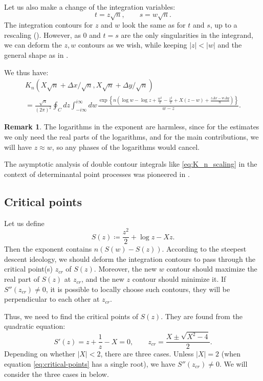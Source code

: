 \documentclass[letterpaper,11pt,oneside,reqno]{article}
\numberwithin{equation}{section}
\newcommand{\ssp}{\hspace{1pt}}
\theoremstyle{definition}
\newtheorem{remark}[proposition]{Remark}
\begin{document}
Let us also make a change of the integration variables:
\begin{equation*}
	t=z\sqrt n,\qquad s=w\sqrt n.
\end{equation*}
The integration contours for $z$ and $w$ look the same as for $t$ and $s$, up to a rescaling
(). However, as $0$
and $t=s$
are the only singularities in the integrand, we can deform the $z,w$
contours as we wish, while keeping $|z|<|w|$
and the general shape as in .

We thus have:
\begin{multline}
	\label{eq:K_n_scaling}
	K_n(X\sqrt n+\Delta x/\sqrt n,X\sqrt n+\Delta y/\sqrt n)\\=
	\frac{\sqrt n}{(2\pi)^2}
	\oint_C dz\int_{-i\infty}^{i\infty}dw\ssp
	\frac{\exp
		\left\{
			n\left(
				\log w -\log z
				+\frac{w^2}{2}-\frac{z^2}{2}
				+X(z-w)+\frac{z \Delta x-w \Delta y}{n}
			\right)
		\right\}
	}{w-z}.
\end{multline}
\begin{remark}
	\label{rmk:log-harmless}
	The logarithms in the exponent are harmless, since for the
	estimates we only need the real parts of the logarithms,
	and for the main contributions, we will have $z\approx w$, so
	any phases of the logarithms would cancel.
\end{remark}

The asymptotic analysis of double contour integrals like
\eqref{eq:K_n_scaling} in the context of determinantal point processes
was pioneered in \cite[Section~3]{Okounkov2002}.

\subsection{Critical points}
\label{sub:critical-points}

Let us define
\begin{equation*}
	S(z)\coloneqq
	\frac{z^2}{2}+\log z -X z.
\end{equation*}
Then the exponent contains $n \left( S(w)-S(z) \right)$.
According to the steepest descent ideology, we
should deform the integration contours
to pass through the critical point(s) $z_{cr}$ of $S(z)$.
Moreover, the new $w$ contour should maximize the real part of $S(z)$
at $z_{cr}$, and the new $z$ contour should minimize it.
If $S''(z_{cr})\ne 0$, it is possible to locally choose such contours,
they will be perpendicular to each other at $z_{cr}$.

Thus, we need to find the critical points of $S(z)$.
They are found from the quadratic equation:
\begin{equation}
	\label{eq:critical-points}
	S'(z)=z+\frac{1}{z}-X=0,\qquad
	z_{cr}=\frac{X\pm \sqrt{X^2-4}}{2}.
\end{equation}
Depending on whether $|X|<2$, there are three cases.
Unless $|X|=2$ (when equation \eqref{eq:critical-points} has a single root), we have
$S''(z_{cr})\ne 0$.
We will consider the three cases in
below.
\end{document}
